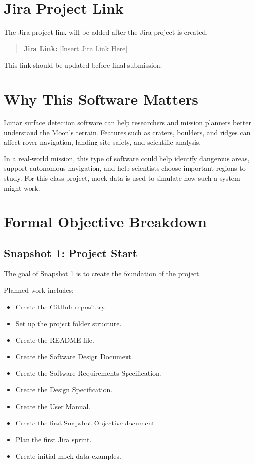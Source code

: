 \documentclass[12pt]{article}
\begin{document}
\section{Jira Project Link}

The Jira project link will be added after the Jira project is created.

\begin{quote}
\textbf{Jira Link:} [Insert Jira Link Here]
\end{quote}

This link should be updated before final submission.

\section{Why This Software Matters}

Lunar surface detection software can help researchers and mission planners better understand the Moon's terrain. Features such as craters, boulders, and ridges can affect rover navigation, landing site safety, and scientific analysis.

In a real-world mission, this type of software could help identify dangerous areas, support autonomous navigation, and help scientists choose important regions to study. For this class project, mock data is used to simulate how such a system might work.

\section{Formal Objective Breakdown}

\subsection{Snapshot 1: Project Start}

The goal of Snapshot 1 is to create the foundation of the project.

Planned work includes:

\begin{itemize}
    \item Create the GitHub repository.
    \item Set up the project folder structure.
    \item Create the README file.
    \item Create the Software Design Document.
    \item Create the Software Requirements Specification.
    \item Create the Design Specification.
    \item Create the User Manual.
    \item Create the first Snapshot Objective document.
    \item Plan the first Jira sprint.
    \item Create initial mock data examples.
\end{itemize}
\end{document}
